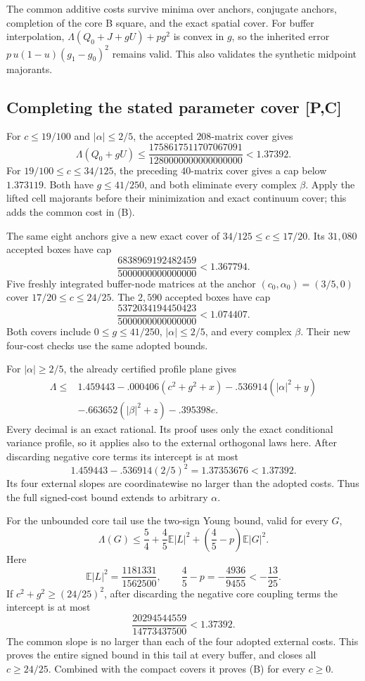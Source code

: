 The common additive costs survive minima over anchors, conjugate anchors,
completion of the core B square, and the exact spatial cover.
For buffer interpolation,
\(\Lambda(Q_0+J+gU)+pg^2\) is convex in \(g\), so the inherited error
\(p\,u(1-u)(g_1-g_0)^2\) remains valid. This also validates the synthetic
midpoint majorants.

\subsection{Completing the stated parameter cover [P,C]}
For \(c\le19/100\) and \(|\alpha|\le2/5\), the accepted \(208\)-matrix
cover gives
\[
\Lambda(Q_0+gU)
\le\frac{1758617511707067091}{1280000000000000000}<1.37392.
\]
For \(19/100\le c\le34/125\), the preceding \(40\)-matrix cover gives a
cap below \(1.373119\). Both have \(g\le41/250\), and both eliminate every
complex \(\beta\). Apply the lifted cell majorants before their minimization
and exact continuum cover; this adds the common cost in (B).

The same eight anchors give a new exact cover of \(34/125\le c\le17/20\).
Its \(31{,}080\) accepted boxes have cap
\[
\frac{6838969192482459}{5000000000000000}<1.367794.
\]
Five freshly integrated buffer-node matrices at the anchor
\((c_0,\alpha_0)=(3/5,0)\) cover \(17/20\le c\le24/25\).
The \(2{,}590\) accepted boxes have cap
\[
\frac{5372034194450423}{5000000000000000}<1.074407.
\]
Both covers include \(0\le g\le41/250\), \(|\alpha|\le2/5\), and every
complex \(\beta\). Their new four-cost checks use the same adopted bounds.

For \(|\alpha|\ge2/5\), the already certified profile plane gives
\[
\begin{split}
\Lambda\le{}&1.459443-.000406(c^2+g^2+x)
-.536914(|\alpha|^2+y)\\
&-.663652(|\beta|^2+z)-.395398e.
\end{split}
\]
Every decimal is an exact rational. Its proof uses only the exact conditional
variance profile, so it applies also to the external orthogonal laws here.
After discarding negative core terms its intercept is at most
\[
1.459443-.536914(2/5)^2=1.37353676<1.37392.
\]
Its four external slopes are coordinatewise no larger than the adopted
costs. Thus the full signed-cost bound extends to arbitrary \(\alpha\).

For the unbounded core tail use the two-sign Young bound, valid for every \(G\),
\[
\Lambda(G)\le\frac54+\frac45\mathbb E|L|^2+
\left(\frac45-p\right)\mathbb E|G|^2.
\]
Here
\[
\mathbb E|L|^2=\frac{1181331}{1562500},\qquad
\frac45-p=-\frac{4936}{9455}<-\frac{13}{25}.
\]
If \(c^2+g^2\ge(24/25)^2\), after discarding the negative core coupling
terms the intercept is at most
\[
\frac{20294544559}{14773437500}<1.37392.
\]
The common slope is no larger than each of the four adopted external costs.
This proves the entire signed bound in this tail at every buffer, and closes
all \(c\ge24/25\). Combined with the compact covers it proves (B) for every
\(c\ge0\).

